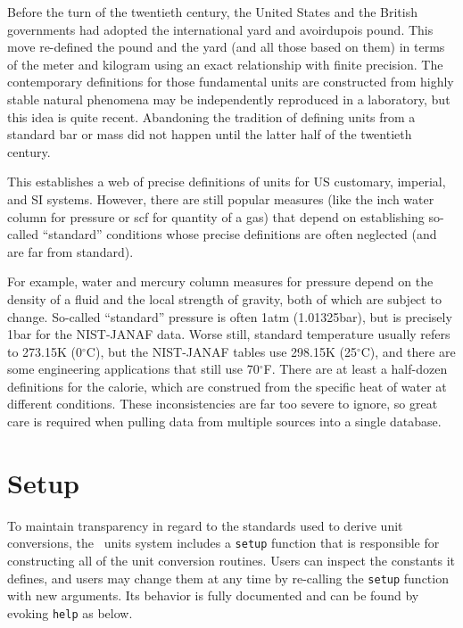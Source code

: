 Before the turn of the twentieth century, the United States and the British governments had adopted the international yard and avoirdupois pound.  This move re-defined the pound and the yard (and all those based on them) in terms of the meter and kilogram using an exact relationship with finite precision.  The contemporary definitions for those fundamental units are constructed from highly stable natural phenomena may be independently reproduced in a laboratory, but this idea is quite recent.  Abandoning the tradition of defining units from a standard bar or mass did not happen until the latter half of the twentieth century. \cite{nbs:sp447}

This establishes a web of precise definitions of units for US customary, imperial, and SI systems.  However, there are still popular measures (like the inch water column for pressure or scf for quantity of a gas) that depend on establishing so-called ``standard'' conditions whose precise definitions are often neglected (and are far from standard).  

For example, water and mercury column measures for pressure depend on the density of a fluid and the local strength of gravity, both of which are subject to change.  So-called ``standard'' pressure is often 1atm (1.01325bar), but is precisely 1bar for the NIST-JANAF data.  Worse still, standard temperature usually refers to 273.15K (0$^\circ$C), but the NIST-JANAF tables use 298.15K (25$^\circ$C), and there are some engineering applications that still use 70$^\circ$F.  There are at least a half-dozen definitions for the calorie, which are construed from the specific heat of water at different conditions.  These inconsistencies are far too severe to ignore, so great care is required when pulling data from multiple sources into a single database.

\section{Setup}\label{sec:units:setup}

To maintain transparency in regard to the standards used to derive unit conversions, the \PM\ units system includes a \verb|setup| function that is responsible for constructing all of the unit conversion routines.  Users can inspect the constants it defines, and users may change them at any time by re-calling the \verb|setup| function with new arguments.  Its behavior is fully documented and can be found by evoking \verb|help| as below.

